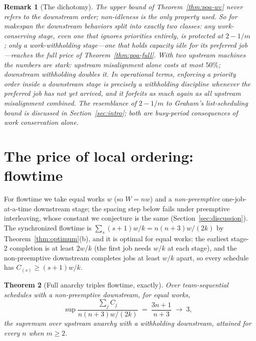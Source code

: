 \documentclass[sn-mathphys,NameDate]{sn-jnl}
\theoremstyle{thmstyleone}
\newtheorem{theorem}{Theorem}
\theoremstyle{thmstylethree}
\theoremstyle{thmstyletwo}
\newtheorem{remark}[theorem]{Remark}
\begin{document}
\begin{remark}[The dichotomy]\label{rem:dichotomy}
The upper bound of Theorem~\ref{thm:poa-wc} never refers to the
downstream \emph{order}; non-idleness is the only property used. So
for makespan the downstream behaviors split into exactly two
classes: any work-conserving stage, even one that ignores
priorities entirely, is protected at $2 - 1/m$; only a
work-withholding stage---one that holds capacity idle for its
preferred job---reaches the full price of
Theorem~\ref{thm:poa-full}. With two upstream machines the numbers
are stark: upstream misalignment alone costs at most $50\%$;
downstream withholding doubles it. In operational terms, enforcing
a priority order \emph{inside} a downstream stage is precisely a
withholding discipline whenever the preferred job has not yet
arrived, and it forfeits as much again as all upstream misalignment
combined. The resemblance of $2 - 1/m$ to Graham's list-scheduling
bound \citep{graham1966} is discussed in
Section~\ref{sec:intro}; both are busy-period consequences of work
conservation alone.
\end{remark}

\section{The price of local ordering: flowtime}
\label{sec:flowtime}

For flowtime we take equal works $w$ (so $W = nw$) and a
\emph{non-preemptive} one-job-at-a-time downstream stage; the
spacing step below fails under preemptive interleaving, whose
constant we conjecture is the same
(Section~\ref{sec:discussion}). The synchronized flowtime is
$\sum_s (s+1)w/k = n(n+3)w/(2k)$ by
Theorem~\ref{thm:optimum}(b), and it is optimal for equal works:
the earliest stage-2 completion is at least $2w/k$ (the first job
needs $w/k$ at each stage), and the non-preemptive downstream
completes jobs at least $w/k$ apart, so every schedule has
$C_{(s)} \ge (s+1)w/k$.

\begin{theorem}[Full anarchy triples flowtime, exactly]
\label{thm:poa-flow}
Over team-sequential schedules with a non-preemptive downstream,
for equal works,
\[
\sup \frac{\sum_j C_j}{n(n+3)w/(2k)} \;=\; \frac{3n+1}{n+3}
\;\longrightarrow\; 3 ,
\]
the supremum over upstream anarchy with a withholding downstream,
attained for every $n$ when $m \ge 2$.
\end{theorem}
\end{document}
